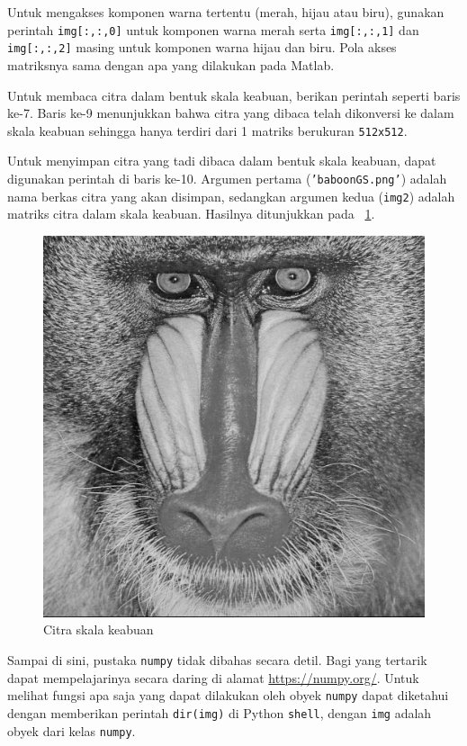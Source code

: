 Untuk mengakses komponen warna tertentu (merah, hijau atau biru), gunakan perintah \texttt{img[:,:,0]} untuk komponen warna merah serta \texttt{img[:,:,1]} dan \texttt{img[:,:,2]} masing untuk komponen warna hijau dan biru. Pola akses matriksnya sama dengan apa yang dilakukan pada Matlab\textregistered.

Untuk membaca citra dalam bentuk skala keabuan, berikan perintah seperti baris ke-7. Baris ke-9 menunjukkan bahwa citra yang dibaca telah dikonversi ke dalam skala keabuan sehingga hanya terdiri dari 1 matriks berukuran \texttt{512x512}.

Untuk menyimpan citra yang tadi dibaca dalam bentuk skala keabuan, dapat digunakan perintah di baris ke-10. Argumen pertama (\texttt{'baboonGS.png'}) adalah nama berkas citra yang akan disimpan, sedangkan argumen kedua (\texttt{img2}) adalah matriks citra dalam skala keabuan. Hasilnya ditunjukkan pada \figurename~\ref{fig:baboonGS}.

\begin{figure}[h!]
  \begin{center}
    \includegraphics[scale=.125]{pics/baboonGS.png}
    \caption{Citra skala keabuan}
    \label{fig:baboonGS}
  \end{center}
\end{figure}

Sampai di sini, pustaka \texttt{numpy} tidak dibahas secara detil. Bagi yang tertarik dapat mempelajarinya secara daring di alamat \url{https://numpy.org/}. Untuk melihat fungsi apa saja yang dapat dilakukan oleh obyek \texttt{numpy} dapat diketahui dengan memberikan perintah \texttt{dir(img)} di Python \texttt{shell}, dengan \texttt{img} adalah obyek dari kelas \texttt{numpy}. 
